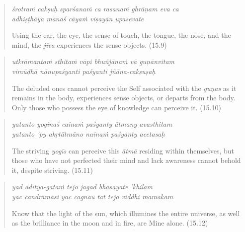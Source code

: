\documentclass[12pt, twoside, openright]{memoir}
\begin{document}
\par
\begin{verse}
\textit{śrotraṁ cakṣuḥ sparśanaṁ ca rasanaṁ ghrāṇam eva ca} \\
\textit{adhiṣṭhāya manaś cāyaṁ viṣayān upasevate}

\noindent Using the ear, the eye, the sense of touch, the tongue, the nose, and the mind, the \textit{jīva} experiences the sense objects. (15.9)
\end{verse}
\par



\par
\begin{verse}
\textit{utkrāmantaṁ sthitaṁ vāpi bhuñjānaṁ vā guṇānvitam} \\
\textit{vimūḍhā nānupaśyanti paśyanti jñāna-cakṣuṣaḥ}

\noindent The deluded ones cannot perceive the Self associated with the \textit{guṇas} as it remains in the body, experiences sense objects, or departs from the body. Only those who possess the eye of knowledge can perceive it. (15.10)
\end{verse}
\par



\par
\begin{verse}
\textit{yatanto yoginaś cainaṁ paśyanty ātmany avasthitam} \\
\textit{yatanto ’py akṛtātmāno nainaṁ paśyanty acetasaḥ}

\noindent The striving \textit{yogīs} can perceive this \textit{ātmā} residing within themselves, but those who have not perfected their mind and lack awareness cannot behold it, despite striving. (15.11)
\end{verse}
\par



\par
\begin{verse}
\textit{yad āditya-gataṁ tejo jagad bhāsayate ’khilam} \\
\textit{yac candramasi yac cāgnau tat tejo viddhi māmakam}

\noindent Know that the light of the sun, which illumines the entire universe, as well as the brilliance in the moon and in fire, are Mine alone. (15.12)
\end{verse}
\par
\end{document}
